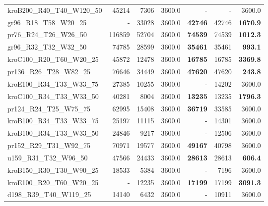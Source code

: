 \documentclass{ro}
\begin{document}
\begin{table}[!htb]
\begin{tabular}{lr@{\hspace{0.5\tabcolsep}}r@{\hspace{\tabcolsep}}r@{\hspace{3.0\tabcolsep}}r@{\hspace{0.3\tabcolsep}}r@{\hspace{0.5\tabcolsep}}r}
		kroB200\_R40\_T40\_W120\_50 & 45214                 & 7306  & 3600.0 & - & -            & 3600.0          \\
		gr96\_R18\_T58\_W20\_25     & - & 33028 & 3600.0 & \textbf{42746}        & 42746                 & \textbf{1670.9} \\
		pr76\_R24\_T26\_W26\_50     & 116859                & 52704 & 3600.0 & \textbf{74539}        & 74539                 & \textbf{1012.3} \\
		gr96\_R32\_T32\_W32\_50     & 74785                 & 28599 & 3600.0 & \textbf{35461}        & 35461                 & \textbf{993.1}  \\
		kroC100\_R20\_T60\_W20\_25  & 45872                 & 12478 & 3600.0 & \textbf{16785}        & 16785                 & \textbf{3369.8} \\
		pr136\_R26\_T28\_W82\_25    & 76646                 & 34449 & 3600.0 & \textbf{47620}        & 47620                 & \textbf{243.8}  \\
		kroE100\_R34\_T33\_W33\_75  & 27385                 & 10255 & 3600.0 & - & 14202                 & 3600.0          \\
		kroC100\_R34\_T33\_W33\_50  & 40281                 & 8004  & 3600.0 & \textbf{13235}        & 13235                 & \textbf{1796.3} \\
		pr124\_R24\_T25\_W75\_75    & 62995                 & 15408 & 3600.0 & \textbf{36719}        & 33585                 & 3600.0          \\
		kroB100\_R34\_T33\_W33\_75  & 25197                 & 11115 & 3600.0 & - & 14301                 & 3600.0          \\
		kroB100\_R34\_T33\_W33\_50  & 24846                 & 9217  & 3600.0 & - & 12506                 & 3600.0          \\
		pr152\_R29\_T31\_W92\_75    & 70971                 & 19577 & 3600.0 & \textbf{49167}        & 40798                 & 3600.0          \\
		u159\_R31\_T32\_W96\_50     & 47566                 & 24433 & 3600.0 & \textbf{28613}        & 28613                 & \textbf{606.4}  \\
		kroB150\_R30\_T30\_W90\_25  & 18533                 & 5384  & 3600.0 & - & 7196                  & 3600.0          \\
		kroE100\_R20\_T60\_W20\_25  & - & 12235 & 3600.0 & \textbf{17199}        & 17199                 & \textbf{3091.3} \\
		d198\_R39\_T40\_W119\_25    & 14140                 & 6432  & 3600.0 & - & 10911                 & 3600.0          \\

\end{tabular}
\end{table}
\end{document}

